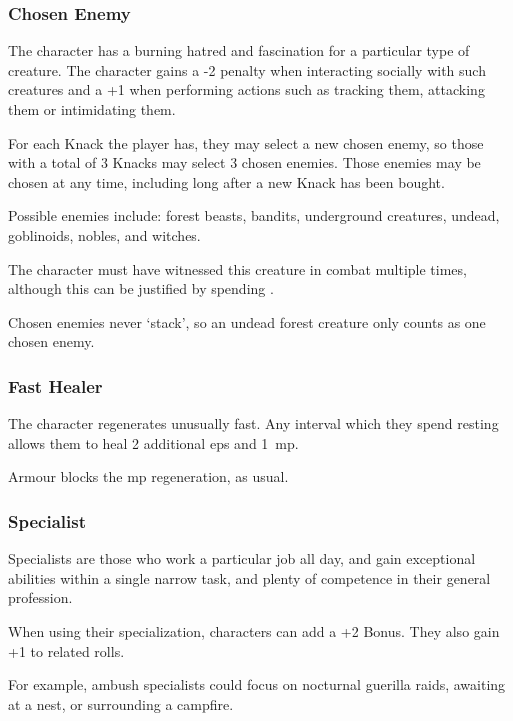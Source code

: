 \begin{multicols}{2}

\subsubsection{Chosen Enemy}

The character has a burning hatred and fascination for a particular type of creature.
The character gains a -2 penalty when interacting socially with such creatures and a +1 when performing actions such as tracking them, attacking them or intimidating them.

For each Knack the player has, they may select a new chosen enemy, so those with a total of 3 Knacks may select 3 chosen enemies. Those enemies may be chosen at any time, including long after a new Knack has been bought.

Possible enemies include: forest beasts, bandits, underground creatures, undead, goblinoids, nobles, and witches.

The character must have witnessed this creature in combat multiple times, although this can be justified by spending .%

Chosen enemies never `stack', so an undead forest creature only counts as one chosen enemy.

\subsubsection{Fast Healer}

The character regenerates unusually fast.
Any \gls{interval} which they spend resting allows them to heal 2 additional \glspl{ep} and 1~\gls{mp}.

Armour blocks the \gls{mp} regeneration, as usual.

\subsubsection{Specialist}
\label{specialist}

Specialists are those who work a particular job all day, and gain exceptional abilities within a single narrow task, and plenty of competence in their general profession.

When using their specialization, characters can add a +2 Bonus.
They also gain +1 to related rolls.

For example, ambush specialists could focus on nocturnal guerilla raids, awaiting at a nest, or surrounding a campfire.


\end{multicols}

